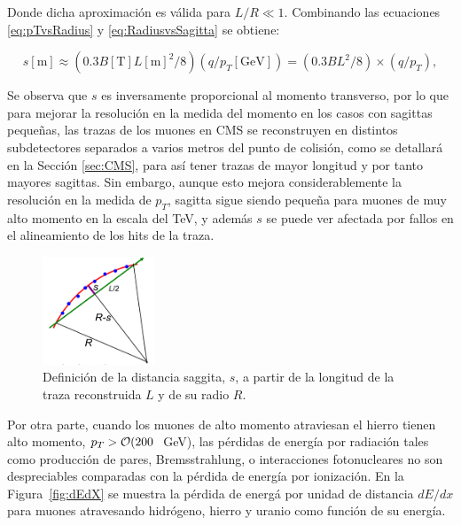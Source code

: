 Donde dicha aproximaci\'on es v\'alida para $L/R \ll 1$. Combinando las ecuaciones \eqref{eq:pTvsRadius} y \eqref{eq:RadiusvsSagitta} se obtiene:

\begin{equation}
  s[\text{m}]\approx (0.3 B [\text{T}] L[\text{m}]^{2}/8) (q/p_{T}[\text{GeV}]) =  (0.3 BL^{2}/8) \times (q/p_{T}),
\label{eq:SagittavsPt}
\end{equation}

Se observa que $s$ es inversamente proporcional al momento transverso, por lo que para mejorar la resoluci\'on en la medida del momento en los casos con sagittas peque\~nas, las trazas de los muones en CMS se reconstruyen en distintos subdetectores separados a varios metros del punto de colisi\'on, como se detallar\'a en la Secci\'on \ref{sec:CMS}, para as\'i tener trazas de mayor longitud y por tanto mayores sagittas. Sin embargo, aunque esto mejora considerablemente la resoluci\'on en la medida de $p_{T}$, sagitta sigue siendo peque\~na para muones de muy alto momento en la escala del TeV, y adem\'as $s$ se puede ver afectada por fallos en el alineamiento de los hits de la traza.

\begin{figure}[h]
\centering
\includegraphics[width=0.30\textwidth]{figures/curvaturesketch.png}
\caption{Definici\'on de la distancia saggita, $s$, a partir de la longitud de la traza reconstruida $L$ y de su radio $R$.}
\label{fig:SagittaDef}
\end{figure}

Por otra parte, cuando los muones de alto momento atraviesan el hierro tienen alto momento, $p_{T} > {\cal O}(200~$ GeV), las p\'erdidas de energ\'ia por radiaci\'on tales como producci\'on de pares, Bremsstrahlung, o interacciones fotonucleares no son despreciables comparadas con la p\'erdida de energ\'ia por ionizaci\'on. En la Figura~\ref{fig:dEdX} se muestra la p\'erdida de energ\'a  por unidad de distancia $dE/dx$ para muones atravesando hidr\'ogeno, hierro y uranio como funci\'on de su energ\'ia.

